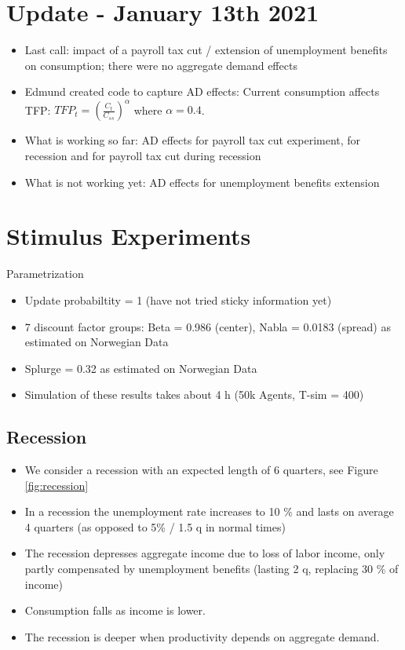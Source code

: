 \documentclass[]{article}
\begin{document}
\newpage
\section{Update - January 13th 2021}
\begin{itemize}
	\item Last call: impact of a payroll tax cut / extension of unemployment benefits on consumption; there were no aggregate demand effects
	\item Edmund created code to capture AD effects: Current consumption affects TFP: $TFP_t = \left(\frac{C_t}{C_{ss}}\right)^\alpha$ where $\alpha = 0.4$.
	\item What is working so far: AD effects for payroll tax cut experiment, for recession and for payroll tax cut during recession
	\item What is not working yet: AD effects for unemployment benefits extension
\end{itemize}

\section{Stimulus Experiments}

Parametrization
\begin{itemize}
	\item Update probabiltity = 1 (have not tried sticky information yet)
	\item 7 discount factor groups: Beta = 0.986 (center), Nabla = 0.0183 (spread) as estimated on Norwegian Data
	\item Splurge = 0.32 as estimated on Norwegian Data
	\item Simulation of these results takes about 4 h (50k Agents, T-sim = 400)
\end{itemize}	

\subsection{Recession}

\begin{itemize}
	\item We consider a recession with an expected length of 6 quarters, see Figure \ref{fig:recession}
	\item In a recession the unemployment rate increases to 10 \% and lasts on average 4 quarters (as opposed to 5\% / 1.5 q in normal times)
	\item The recession depresses aggregate income due to loss of labor income, only partly compensated by unemployment benefits (lasting 2 q, replacing 30 \% of income)
	\item Consumption falls as income is lower.
	\item The recession is deeper when productivity depends on aggregate demand.
\end{itemize}
\end{document}
